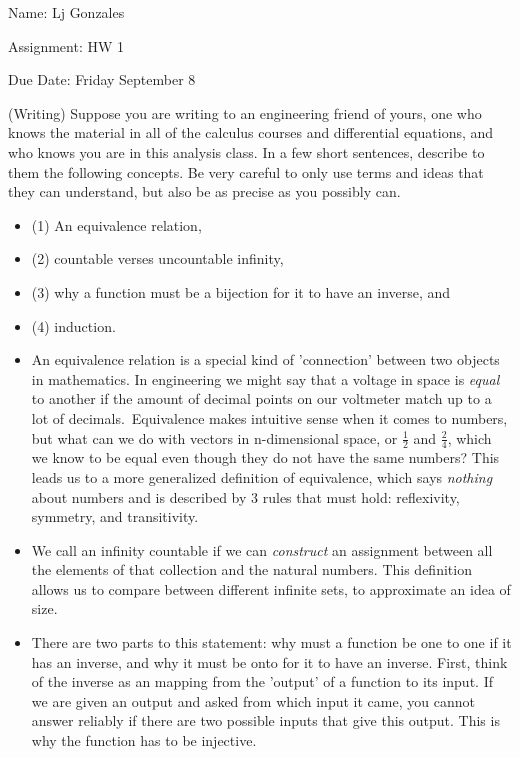\documentclass[11 pt]{article}
\begin{document}
    Name: Lj Gonzales

    Assignment: HW 1 

    Due Date: Friday September 8
    \hfill \break %
    \begin{problem}
(Writing) Suppose you are writing to an engineering friend of yours, one who
knows the material in all of the calculus courses and differential equations, and who
knows you are in this analysis class. In a few short sentences, describe to them
the following concepts. Be very careful to only use terms and ideas that they can
understand, but also be as precise as you possibly can.
\begin{itemize}
	\item (1) An equivalence relation,
	\item (2) countable verses uncountable infinity,
	\item (3) why a function must be a bijection for it to have an inverse, and
	\item (4) induction.
\end{itemize}
    \begin{solution}
    \begin{itemize}
	    \item An equivalence relation is a special kind of 'connection' between two objects in mathematics.
In engineering we might say that a voltage in space is \emph{equal} to another if the amount of decimal points on our voltmeter match up to a lot of decimals.\
Equivalence makes intuitive sense when it comes to numbers, but what can we do with vectors in n-dimensional space, or $\frac{1}{2}$ and $\frac{2}{4}$, which we know to be equal even though they do not have the same numbers? This leads us to a more generalized definition of equivalence, which says \emph{nothing} about numbers and is described by 3 rules that must hold: reflexivity, symmetry, and transitivity.
\item We call an infinity countable if we can \emph{construct} an assignment between all the elements of that collection and the natural numbers.
	This definition allows us to compare between different infinite sets, to approximate an idea of size.
\item There are two parts to this statement: why must a function be one to one if it has an inverse, and why it must be onto for it to have an inverse.
	First, think of the inverse as an mapping from the 'output' of a function to its input. If we are given an output and asked from which input it came, you cannot answer reliably if there are two possible inputs that give this output. This is why the function has to be injective.

\end{itemize}
\end{solution}
\end{problem}
\end{document}
